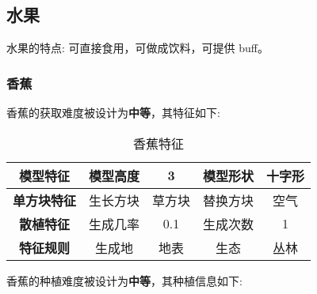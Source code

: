 \subsection{水果}

水果的特点: 可直接食用，可做成饮料，可提供 buff。

\subsubsection{香蕉}

香蕉的获取难度被设计为\textbf{中等}，其特征如下:
\begin{table}[H]
    \centering
    \caption{香蕉特征}
    \label{table:香蕉特征}
    \setlength{\tabcolsep}{4mm}
    \begin{tabular}{c|cc|cc}
        \toprule
        \textbf{模型特征}                  & 模型高度 & 3      & 模型形状 & 十字形 \\
        \midrule
        \textbf{单方块特征}                & 生长方块 & 草方块 & 替换方块 & 空气   \\
        \midrule
        \textbf{散植特征}                  & 生成几率 & 0.1    & 生成次数 & 1      \\
        \midrule
        \textbf{特征规则} & 生成地   & 地表   & 生态     & 丛林   \\
        \bottomrule
    \end{tabular}
\end{table}


香蕉的种植难度被设计为\textbf{中等}，其种植信息如下:


